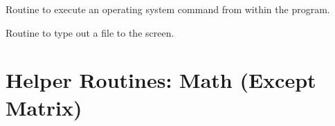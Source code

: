 \begin{description}
\label{r:system.command}
\item[system_command (line, err_flag)] \Newline 
Routine to execute an operating system command from within the program.

\label{r:type.this.file}
\item[type_this_file (filename)] \Newline 
Routine to type out a file to the screen.

\end{description}

\section{Helper Routines: Math (Except Matrix)}
\label{r:helper.math}

